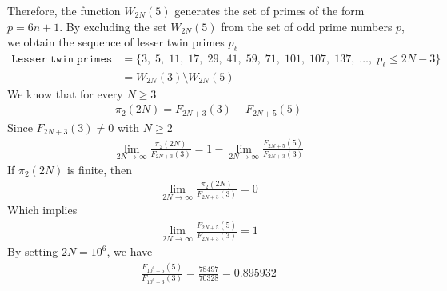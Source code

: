 Therefore, the function $W_{2N}(5)$ generates the set of primes of the form $p=6n+1$.
By excluding the set $W_{2N}(5)$ from the set of odd prime numbers $p$,
we obtain the sequence of lesser twin primes $p_{\ell}$
\begin{align*}
    \mathtt{Lesser \; twin \; primes} &= \{ 3, \; 5, \; 11, \; 17, \; 29, \; 41, \; 59, \; 71, \; 101, \; 107, \; 137, \; \dots, \;  p_{\ell} \leq 2N - 3 \} \\
    &= W_{2N}(3) \setminus W_{2N}(5)
\end{align*}
We know that for every $N\geq 3$
\begin{align*}
    \pi_2 (2N) = F_{2N+3}(3) - F_{2N+5}(5)
\end{align*}
Since $F_{2N+3}(3) \neq 0$ with $N\geq 2$
\begin{align*}
    \lim_{2N\to\infty} \frac{\pi_2(2N)}{F_{2N+3}(3)} = 1 - \lim_{2N\to\infty} \frac{F_{2N+5}(5)}{F_{2N+3}(3)}
\end{align*}
If $\pi_2(2N)$ is finite, then
\begin{align*}
    \lim_{2N\to\infty} \frac{\pi_2(2N)}{F_{2N+3}(3)} = 0
\end{align*}
Which implies
\begin{align*}
    \lim_{2N\to\infty} \frac{F_{2N+5}(5)}{F_{2N+3}(3)} = 1
\end{align*}
By setting $2N = 10^6$, we have
\begin{align*}
    \frac{F_{10^6+5}(5)}{F_{10^6+3}(3)} = \frac{78497}{70328} = 0.895932
\end{align*}
